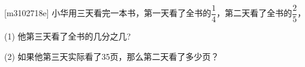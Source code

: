 [m3102718e]\quad
小华用三天看完一本书，第一天看了全书的$\dfrac{1}{4}$，第二天看了全书的$\dfrac{2}{5}$， \par
(1) 他第三天看了全书的几分之几? \par
(2) 如果他第三天实际看了35页，那么第二天看了多少页？
\par
{}